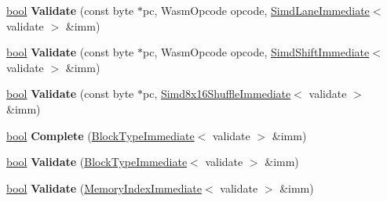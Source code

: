 \begin{DoxyCompactItemize}
\item 
\mbox{\label{classv8_1_1internal_1_1wasm_1_1WasmDecoder_ab3be88801bd014f8c8edca9248768b5d}} 
\mbox{\hyperlink{classbool}{bool}} {\bfseries Validate} (const byte $\ast$pc, Wasm\+Opcode opcode, \mbox{\hyperlink{structv8_1_1internal_1_1wasm_1_1SimdLaneImmediate}{Simd\+Lane\+Immediate}}$<$ validate $>$ \&imm)
\item 
\mbox{\label{classv8_1_1internal_1_1wasm_1_1WasmDecoder_a4de8593879f55e1f1ba752daf4cd4ac8}} 
\mbox{\hyperlink{classbool}{bool}} {\bfseries Validate} (const byte $\ast$pc, Wasm\+Opcode opcode, \mbox{\hyperlink{structv8_1_1internal_1_1wasm_1_1SimdShiftImmediate}{Simd\+Shift\+Immediate}}$<$ validate $>$ \&imm)
\item 
\mbox{\label{classv8_1_1internal_1_1wasm_1_1WasmDecoder_a798780f530098681586fc2c183a2aebc}} 
\mbox{\hyperlink{classbool}{bool}} {\bfseries Validate} (const byte $\ast$pc, \mbox{\hyperlink{structv8_1_1internal_1_1wasm_1_1Simd8x16ShuffleImmediate}{Simd8x16\+Shuffle\+Immediate}}$<$ validate $>$ \&imm)
\item 
\mbox{\label{classv8_1_1internal_1_1wasm_1_1WasmDecoder_ab598309896c1a627447d9ca4a0561319}} 
\mbox{\hyperlink{classbool}{bool}} {\bfseries Complete} (\mbox{\hyperlink{structv8_1_1internal_1_1wasm_1_1BlockTypeImmediate}{Block\+Type\+Immediate}}$<$ validate $>$ \&imm)
\item 
\mbox{\label{classv8_1_1internal_1_1wasm_1_1WasmDecoder_a33ae18bb766d347577a621e7fa6f3e6d}} 
\mbox{\hyperlink{classbool}{bool}} {\bfseries Validate} (\mbox{\hyperlink{structv8_1_1internal_1_1wasm_1_1BlockTypeImmediate}{Block\+Type\+Immediate}}$<$ validate $>$ \&imm)
\item 
\mbox{\label{classv8_1_1internal_1_1wasm_1_1WasmDecoder_ada2877b40a2d41211d290a705ac05296}} 
\mbox{\hyperlink{classbool}{bool}} {\bfseries Validate} (\mbox{\hyperlink{structv8_1_1internal_1_1wasm_1_1MemoryIndexImmediate}{Memory\+Index\+Immediate}}$<$ validate $>$ \&imm)
\item 
\mbox{\label{classv8_1_1internal_1_1wasm_1_1WasmDecoder_a3155be27976fb8f01a30058a1e2c983b}} 

\end{DoxyCompactItemize}
